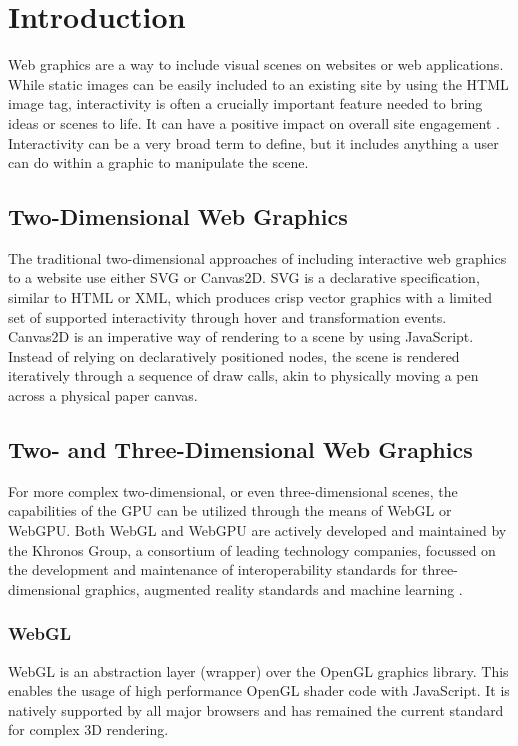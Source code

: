 %
%
% 
% 


\chapter{Introduction}

\label{chap:Intro}
Web graphics are a way to include visual scenes on websites or web applications.
While static images can be easily included to an existing site by using the HTML image tag,
interactivity is often a crucially important feature needed to bring ideas or scenes to life.
It can have a positive impact on overall site engagement \parencite{web-engagement-literature}.
Interactivity can be a very broad term to define, but it includes anything a user can do within
a graphic to manipulate the scene.

\section{Two-Dimensional Web Graphics}
The traditional two-dimensional approaches of including interactive
web graphics to a website use either SVG or Canvas2D.
SVG is a declarative specification, similar to HTML or XML, which produces crisp vector
graphics with a limited set of supported interactivity through hover and transformation events.
Canvas2D is an imperative way of rendering to a scene by using JavaScript.
Instead of relying on declaratively positioned nodes, the scene is rendered iteratively
through a sequence of draw calls, akin to physically moving a pen across a physical paper canvas.

\section{Two- and Three-Dimensional Web Graphics}
For more complex two-dimensional, or even three-dimensional scenes,
the capabilities of the GPU can be utilized through the means of WebGL or WebGPU.
Both WebGL and WebGPU are actively developed and maintained by the Khronos Group, a consortium
of leading technology companies, focussed on the development and maintenance of
interoperability standards for three-dimensional graphics, augmented reality standards and
machine learning \parencite{khronos-web}.

\subsection{WebGL}
WebGL is an abstraction layer (wrapper) over the OpenGL graphics library.
This enables the usage of high performance OpenGL shader code with JavaScript.
It is natively supported by all major browsers and has remained the current standard for
complex 3D rendering.

